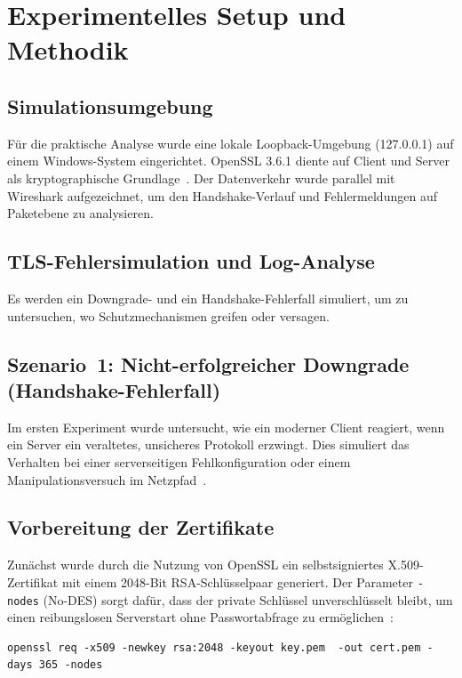\section{Experimentelles Setup und Methodik}

\subsection{Simulationsumgebung}

Für die praktische Analyse wurde eine lokale Loopback-Umgebung (127.0.0.1) auf einem
Windows-System eingerichtet. OpenSSL 3.6.1 diente auf Client und Server als kryptographische Grundlage~\cite{openssl}. Der Datenverkehr wurde parallel mit Wireshark aufgezeichnet, um den Handshake-Verlauf und Fehlermeldungen auf Paketebene zu analysieren.

\subsection{TLS-Fehlersimulation und Log-Analyse}

Es werden ein Downgrade- und ein Handshake-Fehlerfall simuliert, um zu untersuchen, wo Schutzmechanismen greifen oder versagen.

\subsection{Szenario~1: Nicht-erfolgreicher Downgrade (Handshake-Fehlerfall)}

Im ersten Experiment wurde untersucht, wie ein moderner Client reagiert, wenn ein Server
ein veraltetes, unsicheres Protokoll erzwingt. Dies simuliert das Verhalten bei einer
serverseitigen Fehlkonfiguration oder einem Manipulationsversuch im
Netzpfad~\cite{sentinelone}.

\subsection*{Vorbereitung der Zertifikate}

Zunächst wurde durch die Nutzung von OpenSSL ein selbstsigniertes X.509-Zertifikat mit
einem 2048-Bit RSA-Schlüsselpaar generiert. Der Parameter \texttt{-nodes} (No-DES) sorgt
dafür, dass der private Schlüssel unverschlüsselt bleibt, um einen reibungslosen
Serverstart ohne Passwortabfrage zu ermöglichen~\cite{openssl}:

\begin{lstlisting}[style=consolestyle]
openssl req -x509 -newkey rsa:2048 -keyout key.pem  -out cert.pem -days 365 -nodes
\end{lstlisting}

